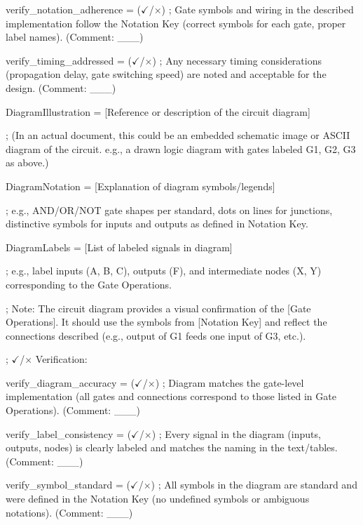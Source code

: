 \documentclass[11pt]{article}
\begin{document}
\noindent verify\_notation\_adherence = ($\checkmark$/$\times$) ; Gate symbols and wiring in the described implementation follow the Notation Key (correct symbols for each gate, proper label names). (Comment: \_\_\_)

\noindent verify\_timing\_addressed = ($\checkmark$/$\times$) ; Any necessary timing considerations (propagation delay, gate switching speed) are noted and acceptable for the design. (Comment: \_\_\_)

\vspace{0.5em}


\noindent DiagramIllustration = [Reference or description of the circuit diagram]

\noindent ; (In an actual document, this could be an embedded schematic image or ASCII diagram of the circuit. e.g., a drawn logic diagram with gates labeled G1, G2, G3 as above.)

\noindent DiagramNotation = [Explanation of diagram symbols/legends]

\noindent ; e.g., AND/OR/NOT gate shapes per standard, dots on lines for junctions, distinctive symbols for inputs and outputs as defined in Notation Key.

\noindent DiagramLabels = [List of labeled signals in diagram]

\noindent ; e.g., label inputs (A, B, C), outputs (F), and intermediate nodes (X, Y) corresponding to the Gate Operations.

\noindent ; Note: The circuit diagram provides a visual confirmation of the [Gate Operations]. It should use the symbols from [Notation Key] and reflect the connections described (e.g., output of G1 feeds one input of G3, etc.).

\vspace{0.5em}

\noindent ; $\checkmark$/$\times$ Verification:

\noindent verify\_diagram\_accuracy = ($\checkmark$/$\times$) ; Diagram matches the gate-level implementation (all gates and connections correspond to those listed in Gate Operations). (Comment: \_\_\_)

\noindent verify\_label\_consistency = ($\checkmark$/$\times$) ; Every signal in the diagram (inputs, outputs, nodes) is clearly labeled and matches the naming in the text/tables. (Comment: \_\_\_)

\noindent verify\_symbol\_standard = ($\checkmark$/$\times$) ; All symbols in the diagram are standard and were defined in the Notation Key (no undefined symbols or ambiguous notations). (Comment: \_\_\_)
\end{document}
